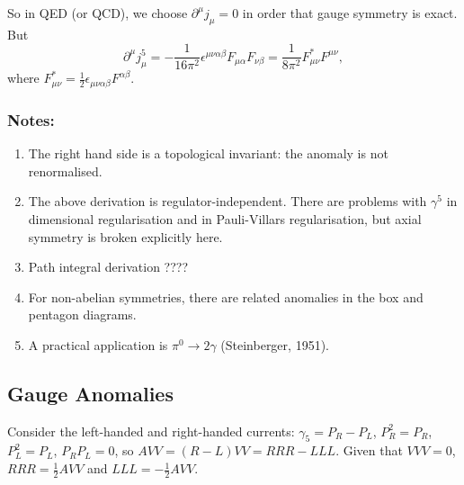 So in QED (or QCD), we choose $\partial^\mu j_\mu = 0$ in order that gauge symmetry is exact. But 
\begin{equation}
\partial^\mu j_\mu^5 = - \frac{1}{16 \pi^2} \epsilon^{\mu \nu \alpha \beta} F_{\mu \alpha} F_{\nu \beta} = \frac{1}{8 \pi^2} F_{\mu \nu}^* F^{\mu \nu},
\end{equation}
where $F_{\mu \nu}^* = \frac{1}{2} \epsilon_{\mu \nu \alpha \beta} F^{\alpha \beta}$.
\subsubsection{Notes:}
\begin{enumerate}
\item The right hand side is a topological invariant: the anomaly is not renormalised.
\item The above derivation is regulator-independent. There are problems with $\gamma^5$ in dimensional regularisation and in Pauli-Villars regularisation, but axial symmetry is broken explicitly here.
\item Path integral derivation ????
\item For non-abelian symmetries, there are related anomalies in the box and pentagon diagrams.
\item A practical application is $\pi^0 \to 2\gamma$ (Steinberger, 1951).
\end{enumerate}
%
\subsection{Gauge Anomalies}
%
Consider the left-handed and right-handed currents: $\gamma_5 = P_R - P_L$, $P_R^2=P_R$, $P_L^2=P_L$, $P_RP_L=0$, so $AVV = (R-L)VV = RRR - LLL$. Given that $VVV=0$, $RRR = \frac{1}{2}AVV$ and $LLL = -\frac{1}{2}AVV$.

